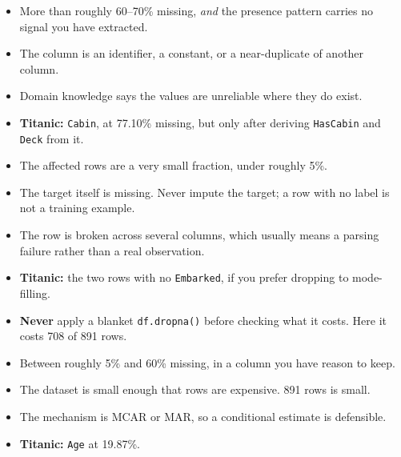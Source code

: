 \documentclass[11pt,a4paper]{article}
\begin{document}


\begin{itemize}\itemsep2pt
  \item More than roughly 60--70\% missing, \emph{and} the presence pattern carries no
        signal you have extracted.
  \item The column is an identifier, a constant, or a near-duplicate of another column.
  \item Domain knowledge says the values are unreliable where they do exist.
  \item \textbf{Titanic:} \texttt{Cabin}, at 77.10\% missing, but only after deriving
        \texttt{HasCabin} and \texttt{Deck} from it.
\end{itemize}


\begin{itemize}\itemsep2pt
  \item The affected rows are a very small fraction, under roughly 5\%.
  \item The target itself is missing. Never impute the target; a row with no label is not
        a training example.
  \item The row is broken across several columns, which usually means a parsing failure
        rather than a real observation.
  \item \textbf{Titanic:} the two rows with no \texttt{Embarked}, if you prefer dropping
        to mode-filling.
  \item \textbf{Never} apply a blanket \lstinline|df.dropna()| before checking what it
        costs. Here it costs 708 of 891 rows.
\end{itemize}


\begin{itemize}\itemsep2pt
  \item Between roughly 5\% and 60\% missing, in a column you have reason to keep.
  \item The dataset is small enough that rows are expensive. 891 rows is small.
  \item The mechanism is MCAR or MAR, so a conditional estimate is defensible.
  \item \textbf{Titanic:} \texttt{Age} at 19.87\%.
\end{itemize}

\end{document}
